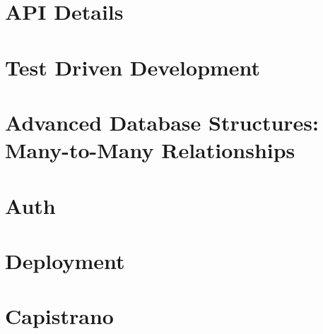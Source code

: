 \documentclass[b5paper,openany]{book}
\begin{document}
\chapter{API Details}


\chapter{Test Driven Development}


\chapter{Advanced Database Structures: Many-to-Many Relationships}


\begin{readonly}
    \chapter{Auth}
    

    \chapter{Deployment}
    

    \chapter{Capistrano}
    
\end{readonly}






\end{document}
